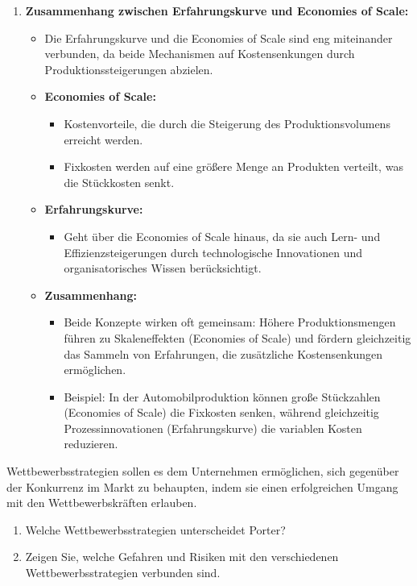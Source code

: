 {\begin{enumerate}[label=(\alph*)]
    \item \textbf{Zusammenhang zwischen Erfahrungskurve und Economies of Scale:}
    \begin{itemize}
        \item Die Erfahrungskurve und die Economies of Scale sind eng miteinander verbunden, da beide Mechanismen auf Kostensenkungen durch Produktionssteigerungen abzielen.
        \item \textbf{Economies of Scale:}
        \begin{itemize}
            \item Kostenvorteile, die durch die Steigerung des Produktionsvolumens erreicht werden.
            \item Fixkosten werden auf eine größere Menge an Produkten verteilt, was die Stückkosten senkt.
        \end{itemize}
        \item \textbf{Erfahrungskurve:}
        \begin{itemize}
            \item Geht über die Economies of Scale hinaus, da sie auch Lern- und Effizienzsteigerungen durch technologische Innovationen und organisatorisches Wissen berücksichtigt.
        \end{itemize}
        \item \textbf{Zusammenhang:}
        \begin{itemize}
            \item Beide Konzepte wirken oft gemeinsam: Höhere Produktionsmengen führen zu Skaleneffekten (Economies of Scale) und fördern gleichzeitig das Sammeln von Erfahrungen, die zusätzliche Kostensenkungen ermöglichen.
            \item Beispiel: In der Automobilproduktion können große Stückzahlen (Economies of Scale) die Fixkosten senken, während gleichzeitig Prozessinnovationen (Erfahrungskurve) die variablen Kosten reduzieren.
        \end{itemize}
    \end{itemize}
\end{enumerate}
}

Wettbewerbsstrategien sollen es dem Unternehmen ermöglichen, sich gegenüber der Konkurrenz im Markt zu behaupten, indem sie einen erfolgreichen Umgang mit den Wettbewerbskräften erlauben.

\begin{enumerate}[label=(\alph*)]
    \item Welche Wettbewerbsstrategien unterscheidet Porter?
    \item Zeigen Sie, welche Gefahren und Risiken mit den verschiedenen Wettbewerbsstrategien verbunden sind.
\end{enumerate}

